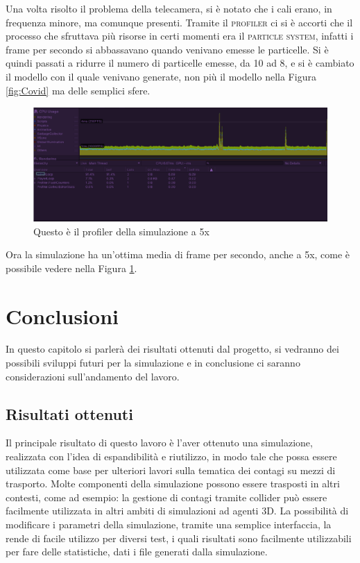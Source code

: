 \documentclass[12pt, openany]{book}
\begin{document}
Una volta risolto il problema della telecamera, si è notato che i cali erano, in frequenza minore, ma comunque presenti. Tramite il \textsc{profiler} ci si è accorti che il processo che sfruttava più risorse in certi momenti era il \textsc{particle system}, infatti i frame per secondo si abbassavano quando venivano emesse le particelle. Si è quindi passati a ridurre il numero di particelle emesse, da 10 ad 8, e si è cambiato il modello con il quale venivano generate, non più il modello nella Figura \ref{fig:Covid} ma delle semplici sfere.
\begin{figure}[H]
	\centering
	\includegraphics[width=1\linewidth]{"Immagini/ProfilerBuoniFPS.png"}
	\caption{Questo è il profiler della simulazione a 5x}
	\label{fig:ProfilerBuoniFPS}
\end{figure} 
Ora la simulazione ha un'ottima media di frame per secondo, anche a 5x, come è possibile vedere nella Figura \ref{fig:ProfilerBuoniFPS}.

\chapter{Conclusioni}
	In questo capitolo si parlerà dei risultati ottenuti dal progetto, si vedranno dei possibili sviluppi futuri per la simulazione e in conclusione ci saranno considerazioni sull'andamento del lavoro.
	\section{Risultati ottenuti}
	Il principale risultato di questo lavoro è l'aver ottenuto una simulazione, realizzata con l'idea di espandibilità e riutilizzo, in modo tale che possa essere utilizzata come base per ulteriori lavori sulla tematica dei contagi su mezzi di trasporto. Molte componenti della simulazione possono essere trasposti in altri contesti, come ad esempio: la gestione di contagi tramite collider può essere facilmente utilizzata in altri ambiti di simulazioni ad agenti 3D. La possibilità di modificare i parametri della simulazione, tramite una semplice interfaccia, la rende di facile utilizzo per diversi test, i quali risultati sono facilmente utilizzabili per fare delle statistiche, dati i file generati dalla simulazione.
\end{document}
